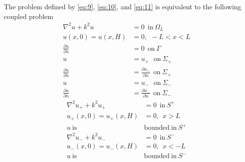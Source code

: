 \documentclass[11pt]{article}
\begin{document}
The problem defined by \eqref{eq:9}, \eqref{eq:10}, and \eqref{eq:11} is equivalent to the following coupled problem
\begin{subequations}
  \label{eq:omegaL}
\begin{align}
  \nabla^2 u + k^2u &= 0~~\mathrm{in}~\Omega_L \\
  u(x,0)=u(x,H)&=0,~~-L < x < L \\
  \frac{\partial u}{\partial n} &= 0~~\mathrm{on}~ \Gamma \\
  u &= u_{+}~~~\mathrm{on}~ \Sigma_{+} \label{eq:cp1} \\
  \frac{\partial u}{\partial n} &= \frac{\partial u_{+}}{\partial n}~~\mathrm{on}~\Sigma_{+}  \label{eq:cp2}\\
    u &= u_{-}~~~\mathrm{on}~ \Sigma_{-} \\
  \frac{\partial u}{\partial n} &= \frac{\partial u_{-}}{\partial n}~~\mathrm{on}~\Sigma_{-}
\end{align}
\end{subequations}
\begin{subequations}
  \label{eq:Sp}
\begin{align}
  \nabla^2 u_+ + k^2u_+ &= 0~~\mathrm{in}~S^+ \\
  u_+(x,0)=u_+(x,H) &=0,~~x > L \\
  u~\mathrm{is}~&\mathrm{bounded}~\mathrm{in}~S^+
\end{align}  
\end{subequations}
\begin{subequations}
  \label{eq:Sm}
\begin{align}
  \nabla^2 u_- + k^2u_- &= 0~~\mathrm{in}~S^- \\
  u_-(x,0)=u_-(x,H) &=0,~~x < -L \\
  u~\mathrm{is}~&\mathrm{bounded}~\mathrm{in}~S^-
\end{align}  
\end{subequations}
\end{document}
